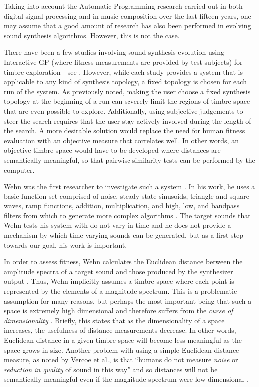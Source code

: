 \documentclass[a4paper,12pt]{report} 	%
\numberwithin{figure}{chapter}
\numberwithin{table}{chapter}
\numberwithin{equation}{chapter}
\begin{document}
\begin{flushleft}
Taking into account the Automatic Programming research carried out in both digital signal processing and in music composition over the last fifteen years, one may assume that a good amount of research has also been performed in evolving sound synthesis algorithms. However, this is not the case.

There have been a few studies involving sound synthesis evolution using Interactive-GP (where fitness measurements are provided by test subjects) for timbre exploration---see \cite{Dahlstedt:2001d, Mandelis:2005iw, McDermott:2006gd}. However, while each study provides a system that is applicable to any kind of synthesis topology, a fixed topology is chosen for each run of the system. As previously noted, making the user choose a fixed synthesis topology at the beginning of a run can severely limit the regions of timbre space that are even possible to explore. Additionally, using subjective judgements to steer the search requires that the user stay actively involved during the length of the search. A more desirable solution would replace the need for human fitness evaluation with an objective measure that correlates well. In other words, an objective timbre space would have to be developed where distances are semantically meaningful, so that pairwise similarity tests can be performed by the computer.

Wehn was the first researcher to investigate such a system \cite{Wehn:1998bh}. In his work, he uses a basic function set comprised of noise, steady-state sinusoids, triangle and square waves, ramp functions, addition, multiplication, and high, low, and bandpass filters from which to generate more complex algorithms \cite[p. 2]{Wehn:1998bh}. The target sounds that Wehn tests his system with do not vary in time and he does not provide a mechanism by which time-varying sounds can be generated, but as a first step towards our goal, his work is important.

In order to assess fitness, Wehn calculates the Euclidean distance between the amplitude spectra of a target sound and those produced by the synthesizer output \cite[p. 2]{Wehn:1998bh}. Thus, Wehn implicitly assumes a timbre space where each point is represented by the elements of a magnitude spectrum. This is a problematic assumption for many reasons, but perhaps the most important being that such a space is extremely high dimensional and therefore suffers from the \emph{curse of dimensionality} \cite{Powell:NoRead}. Briefly, this states that as the dimensionality of a space increases, the usefulness of distance measurements decrease. In other words, Euclidean distance in a given timbre space will become less meaningful as the space grows in size. Another problem with using a simple Euclidean distance measure, as noted by Vercoe et al., is that ``humans do not measure \emph{noise} or \emph{reduction in quality} of sound in this way'' and so distances will not be semantically meaningful even if the magnitude spectrum were low-dimensional \cite[p. 2]{Vercoe:1998hh}.


\end{flushleft}
\end{document}

